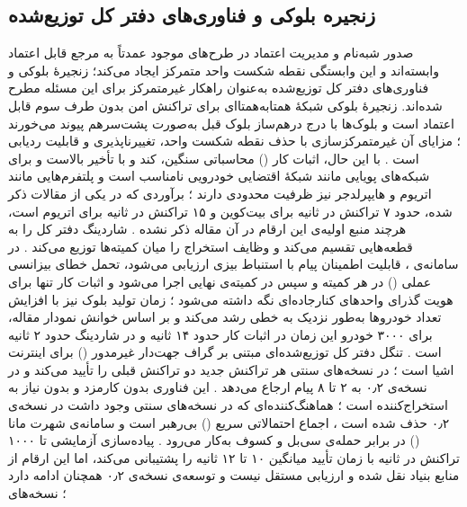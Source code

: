 \documentclass[12pt,a4paper]{article}
\begin{document}
\subsection{زنجیره بلوکی و فناوری‌های دفتر کل توزیع‌شده}

صدور شبه‌نام و مدیریت اعتماد در طرح‌های موجود عمدتاً به مرجع قابل اعتماد وابسته‌اند و این وابستگی نقطه شکست واحد متمرکز ایجاد می‌کند؛ زنجیرهٔ بلوکی و فناوری‌های دفتر کل توزیع‌شده به‌عنوان راهکار غیرمتمرکز برای این مسئله مطرح شده‌اند. زنجیرهٔ بلوکی شبکهٔ همتا‌به‌همتا‌ای برای تراکنش امن بدون طرف سوم قابل اعتماد است و بلوک‌ها با درج درهم‌ساز بلوک قبل به‌صورت پشت‌سرهم پیوند می‌خورند \cite{razaBlockchainBasedReputationTrust2024}؛ مزایای آن غیرمتمرکزسازی با حذف نقطه شکست واحد، تغییرناپذیری و قابلیت ردیابی است \cite{razaBlockchainBasedReputationTrust2024}. با این حال، اثبات کار () محاسباتی سنگین، کند و با تأخیر بالاست و برای شبکه‌های پویایی مانند شبکهٔ اقتضایی خودرویی نامناسب است و پلتفرم‌هایی مانند اتریوم و هایپرلدجر نیز ظرفیت محدودی دارند \cite{razaBlockchainBasedReputationTrust2024}؛ برآوردی که در یکی از مقالات ذکر شده، حدود ۷ تراکنش در ثانیه برای بیت‌کوین و ۱۵ تراکنش در ثانیه برای اتریوم است، هرچند منبع اولیه‌ی این ارقام در آن مقاله ذکر نشده \cite{IOTATANGLE20}. شاردینگ دفتر کل را به قطعه‌هایی تقسیم می‌کند و وظایف استخراج را میان کمیته‌ها توزیع می‌کند \cite{ghovanlooyghajarSBTMSScalableBlockchain2021}. در سامانه‌ی ، قابلیت اطمینان پیام با استنباط بیزی ارزیابی می‌شود، تحمل خطای بیزانسی عملی () در هر کمیته و سپس در کمیته‌ی نهایی اجرا می‌شود و اثبات کار تنها برای هویت گذرای واحد‌های کنارجاده‌ای نگه داشته می‌شود \cite{ghovanlooyghajarSBTMSScalableBlockchain2021}؛ زمان تولید بلوک نیز با افزایش تعداد خودرو‌ها به‌طور نزدیک به خطی رشد می‌کند و بر اساس خوانش نمودار مقاله، برای ۳۰۰۰ خودرو این زمان در اثبات کار حدود ۱۴ ثانیه و در شاردینگ حدود ۲ ثانیه است \cite{ghovanlooyghajarSBTMSScalableBlockchain2021}. تنگل  دفتر کل توزیع‌شده‌ای مبتنی بر گراف جهت‌دار غیرمدور () برای اینترنت اشیا است \cite{silvanoIotaTangleCryptocurrency2020, sealeyIOTATangle202022}؛ در نسخه‌های سنتی هر تراکنش جدید دو تراکنش قبلی را تأیید می‌کند \cite{silvanoIotaTangleCryptocurrency2020} و در نسخه‌ی ۰٫۲ به ۲ تا ۸ پیام ارجاع می‌دهد \cite{IOTATANGLE20, sealeyIOTATangle202022}. این فناوری بدون کارمزد و بدون نیاز به استخراج‌کننده است \cite{sealeyIOTATangle202022, IOTATANGLE20}؛ هماهنگ‌کننده‌ای که در نسخه‌های سنتی وجود داشت \cite{silvanoIotaTangleCryptocurrency2020} در نسخه‌ی ۰٫۲ حذف شده است \cite{IOTATANGLE20, sealeyIOTATangle202022}، اجماع احتمالاتی سریع () بی‌رهبر است \cite{sealeyIOTATangle202022} و سامانه‌ی شهرت مانا () در برابر حمله‌ی سی‌بل و کسوف به‌کار می‌رود \cite{sealeyIOTATangle202022}. پیاده‌سازی آزمایشی  تا ۱۰۰۰ تراکنش در ثانیه با زمان تأیید میانگین ۱۰ تا ۱۲ ثانیه را پشتیبانی می‌کند، اما این ارقام از منابع بنیاد  نقل شده و ارزیابی مستقل نیست \cite{sealeyIOTATangle202022} و توسعه‌ی نسخه‌ی ۰٫۲ همچنان ادامه دارد \cite{IOTATANGLE20}؛ نسخه‌های 
\end{document}
